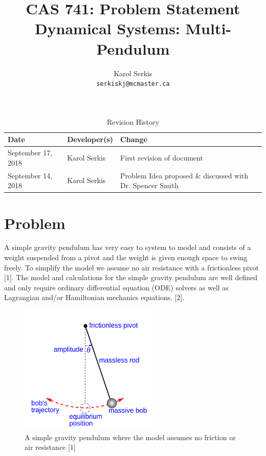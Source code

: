 \documentclass{article}
\title{CAS 741: Problem Statement\\[10pt]\Large Dynamical Systems: 
Multi-Pendulum }
\author{Karol Serkis\\\texttt{serkiskj@mcmaster.ca}}
\date{}
\begin{document}

\maketitle

\begin{table}[hp]
\caption{Revision History} \label{TblRevisionHistory}
\begin{tabularx}{\textwidth}{llX}
\toprule
\textbf{Date} & \textbf{Developer(s)} & \textbf{Change}\\
\midrule
September 17, 2018 & Karol Serkis & First revision of document\\
September 14, 2018 & Karol Serkis & Problem Idea proposed \& discussed with Dr.
Spencer Smith \\
\bottomrule
\end{tabularx}
\end{table}

\section*{Problem}

A simple gravity pendulum has very easy to system to model and consists of a
weight suspended from a pivot and the weight is given enough space to swing
freely. To simplify the model we assume no air resistance with a frictionless
pivot [1]. The model and calculations for the simple gravity pendulum are well
defined and only require ordinary differential equation (ODE) solvers as well 
as Lagrangian and/or Hamiltonian mechanics equations.
[2]. 
\begin{figure}[H]
	\centering
	\includegraphics[width=250px]{simple-pend.png}
\caption{A simple gravity pendulum where the model assumes no friction or air
resistance [1]}
	\label{fig:simplepend}
\end{figure}
\end{document}
